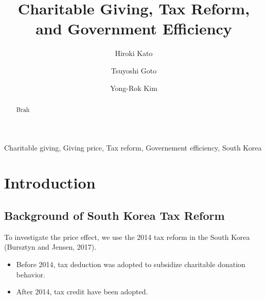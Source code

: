 \documentclass[ review  , 3p ]{elsarticle}
\providecommand{\tightlist}{%
  \setlength{\itemsep}{0pt}\setlength{\parskip}{0pt}}
\begin{document}
  \begin{frontmatter}

    \title{Charitable Giving, Tax Reform, and Government Efficiency}
                \author[Osaka University]{
      Hiroki Kato 
       \corref{*} }
        \author[Chiba University]{
      Tsuyoshi Goto 
      }
        \author[Kobe University]{
      Yong-Rok Kim 
      }
            \address[Osaka University]{Graduate School of Economics, Osaka University, Japan}
        \address[Chiba University]{Graduate School of Economics, Chiba University, Japan}
        \address[Kobe University]{Graduate School of Economics, Kobe University, Japan}
      
        \begin{abstract}
      Brah
    \end{abstract}
      
        \begin{keyword}
      Charitable giving, Giving price, Tax reform, Governement efficiency, South Korea
    \end{keyword}
    
  \end{frontmatter}

  \hypertarget{introduction}{%
  \section{Introduction}\label{introduction}}

  \hypertarget{background-of-south-korea-tax-reform}{%
  \subsection{Background of South Korea Tax Reform}\label{background-of-south-korea-tax-reform}}

  To investigate the price effect, we use the 2014 tax reform in the South Korea
  (Bursztyn and Jensen, 2017).

  \begin{itemize}
  \tightlist
  \item
    Before 2014, tax deduction was adopted to subsidize charitable donation behavior.
  \item
    After 2014, tax credit have been adopted.
  \end{itemize}
\end{document}
